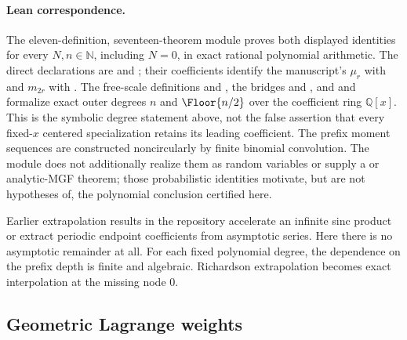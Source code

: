\paragraph{Lean correspondence.}
The eleven-definition, seventeen-theorem module
 proves both displayed
identities for every \(N,n\in\mathbb N\), including \(N=0\), in exact rational
polynomial arithmetic.  The direct declarations are
 and
; their
coefficients identify the manuscript's \(\mu_r\) with  and
\(m_{2r}\) with .  The free-scale definitions
 and
, the bridges
 and
, and
 and
formalize exact outer degrees
\(n\) and \(\Floor{n/2}\) over the coefficient ring \(\mathbb Q[x]\).  This is
the symbolic degree statement above, not the false assertion that every
fixed-\(x\) centered specialization retains its leading coefficient.  The
prefix moment sequences are constructed noncircularly by finite binomial
convolution.  The module does not additionally realize them as random
variables or supply a  or analytic-MGF theorem; those
probabilistic identities motivate, but are not hypotheses of, the polynomial
conclusion certified here.

\begin{remark}
Earlier extrapolation results in the repository accelerate an infinite sinc product or extract
periodic endpoint coefficients from asymptotic series.  Here there is no asymptotic remainder at
all.  For each fixed polynomial degree, the dependence on the prefix depth is finite and algebraic.
Richardson extrapolation becomes exact interpolation at the missing node $0$.
\end{remark}

\subsection{Geometric Lagrange weights}

